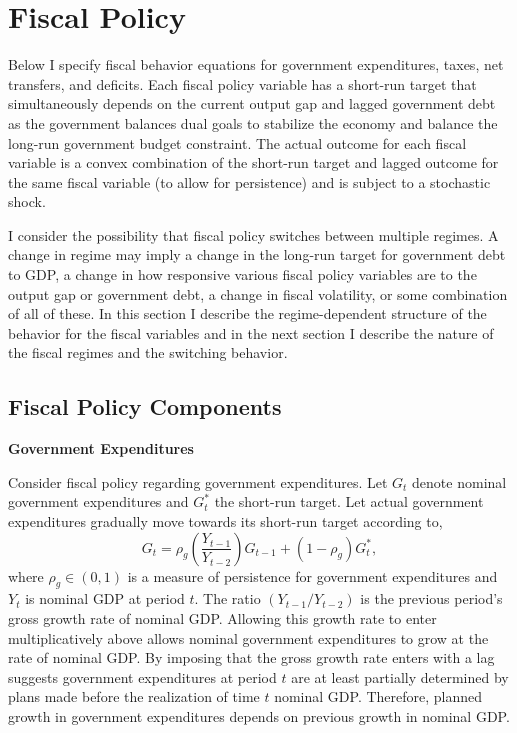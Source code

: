 \documentclass[11pt]{article}
\newcommand{\beq}{\begin{equation}}
\newcommand{\eeq}{\end{equation}}
\begin{document}
\newpage

\section{Fiscal Policy}\label{s:fiscal}

Below I specify fiscal behavior equations for government expenditures, taxes, net transfers, and deficits.  Each fiscal policy variable has a short-run target that simultaneously depends on the current output gap and lagged government debt as the government balances dual goals to stabilize the economy and balance the long-run government budget constraint.  The actual outcome for each fiscal variable is a convex combination of the short-run target and lagged outcome for the same fiscal variable (to allow for persistence) and is subject to a stochastic shock.

I consider the possibility that fiscal policy switches between multiple regimes.  A change in regime may imply a change in the long-run target for government debt to GDP, a change in how responsive various fiscal policy variables are to the output gap or government debt, a change in fiscal volatility, or some combination of all of these.  In this section I describe the regime-dependent structure of the behavior for the fiscal variables and in the next section I describe the nature of the fiscal regimes and the switching behavior.

\subsection{Fiscal Policy Components}

\textbf{Government Expenditures}

\noindent Consider fiscal policy regarding government expenditures.  Let $G_t$ denote nominal government expenditures and $G_t^*$ the short-run target.  Let actual government expenditures gradually move towards its short-run target according to,
\beq \label{eq:gov} G_t = \rho_g \left( \frac{Y_{t-1}}{Y_{t-2}} \right) G_{t-1} + \left(1-\rho_g\right) G_t^*, \eeq
where $\rho_g \in (0,1)$ is a measure of persistence for government expenditures and $Y_t$ is nominal GDP at period $t$.  The ratio $(Y_{t-1}/Y_{t-2})$ is the previous period's gross growth rate of nominal GDP.  Allowing this growth rate to enter multiplicatively above allows nominal government expenditures to grow at the rate of nominal GDP.  By imposing that the gross growth rate enters with a lag suggests government expenditures at period $t$ are at least partially determined by plans made before the realization of time $t$ nominal GDP.  Therefore, planned growth in government expenditures depends on previous growth in nominal GDP.
\end{document}
